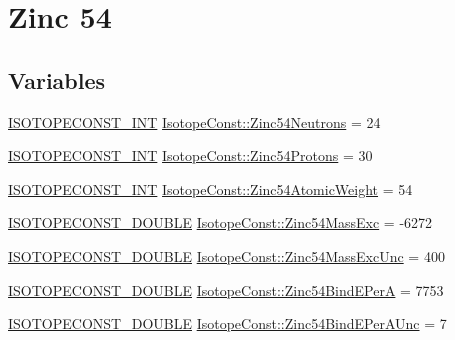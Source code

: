 \hypertarget{group___isotope_const-_zinc-_zn54}{}\section{Zinc 54}
\label{group___isotope_const-_zinc-_zn54}
\subsection*{Variables}
\begin{DoxyCompactItemize}
\item 
\mbox{\hyperlink{group___isotope_const-_macros_ga5f18360b3e99483a35c32d789e62621c}{I\+S\+O\+T\+O\+P\+E\+C\+O\+N\+S\+T\+\_\+\+I\+NT}} \mbox{\hyperlink{group___isotope_const-_zinc-_zn54_ga6da8b9c4fcc12f097b8674744e892751}{Isotope\+Const\+::\+Zinc54\+Neutrons}} = 24
\item 
\mbox{\hyperlink{group___isotope_const-_macros_ga5f18360b3e99483a35c32d789e62621c}{I\+S\+O\+T\+O\+P\+E\+C\+O\+N\+S\+T\+\_\+\+I\+NT}} \mbox{\hyperlink{group___isotope_const-_zinc-_zn54_gaab8242d777a3cd06e517618055539bf3}{Isotope\+Const\+::\+Zinc54\+Protons}} = 30
\item 
\mbox{\hyperlink{group___isotope_const-_macros_ga5f18360b3e99483a35c32d789e62621c}{I\+S\+O\+T\+O\+P\+E\+C\+O\+N\+S\+T\+\_\+\+I\+NT}} \mbox{\hyperlink{group___isotope_const-_zinc-_zn54_gac24f53316cc5e5686bca20295b6c46f5}{Isotope\+Const\+::\+Zinc54\+Atomic\+Weight}} = 54
\item 
\mbox{\hyperlink{group___isotope_const-_macros_ga8f45a7272ce02c0b4c65c44636ed719a}{I\+S\+O\+T\+O\+P\+E\+C\+O\+N\+S\+T\+\_\+\+D\+O\+U\+B\+LE}} \mbox{\hyperlink{group___isotope_const-_zinc-_zn54_gafe8be1cf16f22a9011cd873ec8e372c8}{Isotope\+Const\+::\+Zinc54\+Mass\+Exc}} = -\/6272
\item 
\mbox{\hyperlink{group___isotope_const-_macros_ga8f45a7272ce02c0b4c65c44636ed719a}{I\+S\+O\+T\+O\+P\+E\+C\+O\+N\+S\+T\+\_\+\+D\+O\+U\+B\+LE}} \mbox{\hyperlink{group___isotope_const-_zinc-_zn54_ga9d89f17f795e8cf92890bda97580fd87}{Isotope\+Const\+::\+Zinc54\+Mass\+Exc\+Unc}} = 400
\item 
\mbox{\hyperlink{group___isotope_const-_macros_ga8f45a7272ce02c0b4c65c44636ed719a}{I\+S\+O\+T\+O\+P\+E\+C\+O\+N\+S\+T\+\_\+\+D\+O\+U\+B\+LE}} \mbox{\hyperlink{group___isotope_const-_zinc-_zn54_gac68ae2aba6eb81b8dccc30a0cdffb3f1}{Isotope\+Const\+::\+Zinc54\+Bind\+E\+PerA}} = 7753
\item 
\mbox{\hyperlink{group___isotope_const-_macros_ga8f45a7272ce02c0b4c65c44636ed719a}{I\+S\+O\+T\+O\+P\+E\+C\+O\+N\+S\+T\+\_\+\+D\+O\+U\+B\+LE}} \mbox{\hyperlink{group___isotope_const-_zinc-_zn54_ga16a9202cebc01ff80bea51c262c75ced}{Isotope\+Const\+::\+Zinc54\+Bind\+E\+Per\+A\+Unc}} = 7

\end{DoxyCompactItemize}
